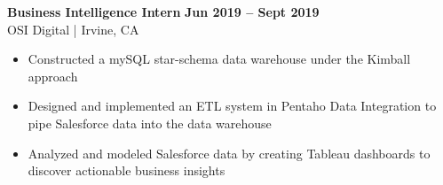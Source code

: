 \textbf{Business Intelligence Intern} \hfill \textbf{Jun 2019 -- Sept 2019} \\
OSI Digital | Irvine, CA
    \squish
    \begin{itemize}
        \item Constructed a mySQL star-schema data warehouse under the Kimball approach
        \item Designed and implemented an ETL system in Pentaho Data Integration to pipe Salesforce data into the data warehouse
        \item Analyzed and modeled Salesforce data by creating Tableau dashboards to discover actionable business insights
    \end{itemize}